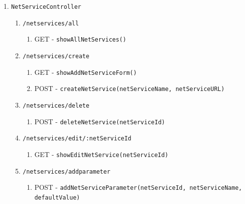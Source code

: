\documentclass[12pt,DIV14,BCOR10mm,a4paper,parskip=half-,headsepline,headinclude,english,ngerman,bibliography=totocnumbered]{scrreprt}
\begin{document}
\begin{enumerate}
\begin{enumerate}
    \item \texttt{NetServiceController}
    \begin{enumerate}
      \item \texttt{/netservices/all}
        \begin{enumerate}
          \item GET - \texttt{showAllNetServices()}
        \end{enumerate}
      \item \texttt{/netservices/create}
        \begin{enumerate}
          \item GET - \texttt{showAddNetServiceForm()}
          \item POST - \texttt{createNetService(netServiceName, netServiceURL)}
        \end{enumerate}
      \item \texttt{/netservices/delete}
        \begin{enumerate}
          \item POST - \texttt{deleteNetService(netServiceId)}
        \end{enumerate}
      \item \texttt{/netservices/edit/:netServiceId}
        \begin{enumerate}
          \item GET - \texttt{showEditNetService(netServiceId)}
        \end{enumerate}
      \item \texttt{/netservices/addparameter}
        \begin{enumerate}
          \item POST - \texttt{addNetServiceParameter(netServiceId, netServiceName, defaultValue)}
        \end{enumerate}



\end{enumerate}
\end{enumerate}
\end{enumerate}
\end{document}
